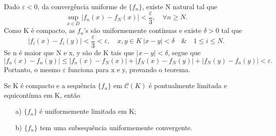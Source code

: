 \documentclass[../analysis_notes.tex]{subfiles}
\begin{document}
\begin{proof*}
	Dado \(\varepsilon <0\), da convergência uniforme de \(\{f_{n}\}\), existe N natural tal que
	\[
		\sup_{x\in D}|f_{n}(x)-f_{N}(x)| < \frac{\varepsilon }{3},\quad \forall n\geq N.
	\]
	Como K é compacto, as \(f_{n}\)'s são uniformemente contínuas e existe \(\delta >0\) tal que
	\[
		|f_{i}(x)-f_{i}(y)|<\frac{\varepsilon }{3} < \varepsilon ,\quad x, y\in K\: |x-y|<\delta \quad\&\quad 1\leq i\leq N.
	\]
	Se n é maior que N e x, y são de K tais que \(|x-y|<\delta \), segue que
	\[
		|f_{n}(x)-f_{n}(y)| \leq |f_{n}(x)-f_{N}(x)|+|f_{N}(x)-f_{N}(y)|+|f_{N}(y)-f_{n}(y)| < \varepsilon .
	\]
	Portanto, o mesmo \(\varepsilon \) funciona para x e y, provando o teorema. \qedsymbol
\end{proof*}
\begin{theorem*}
	Se K é compacto e a sequência \(\{f_{n}\}\) em \(\mathcal{C}(K)\) é pontualmente limitada e equicontínua em K, então
	\begin{itemize}
		\item[a)] \(\{f_{n}\}\) é uniformemente limitada em K;
		\item[b)] \(\{f_{n}\}\) tem uma subsequência  uniformemente convergente.
	\end{itemize}
\end{theorem*}
\end{document}
